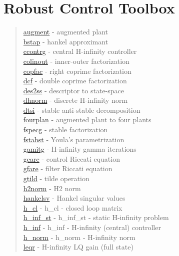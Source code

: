 \chapter*{Robust Control Toolbox}

\begin{quote}
\noindent
\hyperlink{augment}{augment} - {augmented plant} \\  
\hyperlink{bstap}{bstap} - {hankel approximant} \\  
\hyperlink{ccontrg}{ccontrg} - {central H-infinity controller} \\  
\hyperlink{colinout}{colinout} - {inner-outer factorization} \\  
\hyperlink{copfac}{copfac} - {right coprime factorization} \\  
\hyperlink{dcf}{dcf} - {double coprime factorization} \\  
\hyperlink{des2ss}{des2ss} - {descriptor to state-space} \\  
\hyperlink{dhnorm}{dhnorm} - {discrete H-infinity norm} \\  
\hyperlink{dtsi}{dtsi} - {stable anti-stable decomposition} \\  
\hyperlink{fourplan}{fourplan} - {augmented plant to four plants} \\  
\hyperlink{fspecg}{fspecg} - {stable factorization} \\  
\hyperlink{fstabst}{fstabst} - {Youla's parametrization} \\  
\hyperlink{gamitg}{gamitg} - {H-infinity gamma iterations} \\  
\hyperlink{gcare}{gcare} - {control Riccati equation} \\  
\hyperlink{gfare}{gfare} - {filter Riccati equation} \\  
\hyperlink{gtild}{gtild} - {tilde operation} \\  
\hyperlink{h2norm}{h2norm} - {H2 norm} \\  
\hyperlink{hankelsv}{hankelsv} - {Hankel singular values} \\  
\hyperlink{h_cl}{h\_cl} - {h_cl} - {closed loop matrix} \\  
\hyperlink{h_inf_st}{h\_inf\_st} - {h_inf_st} - {static H-infinity problem} \\  
\hyperlink{h_inf}{h\_inf} - {h_inf} - {H-infinity (central) controller} \\  
\hyperlink{h_norm}{h\_norm} - {h_norm} - {H-infinity norm} \\  
\hyperlink{leqr}{leqr} - {H-infinity LQ gain (full state)  } \\  

\end{quote}
